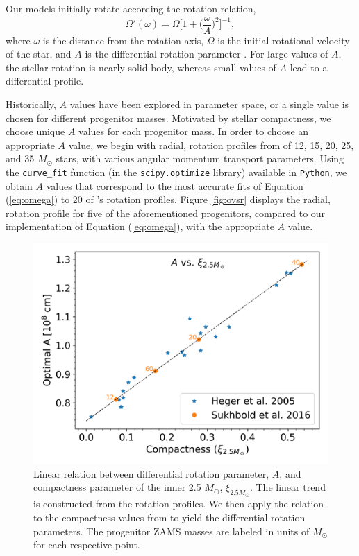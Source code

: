 \documentclass[twocolumn,times]{aastex62}  %
\begin{document}
Our models initially rotate according the rotation relation, 
\begin{equation}
    \Omega'(\omega) = \Omega \bigg[1 + \bigg(\frac{\omega}{A}\bigg)^2 \bigg]^{-1}, 
    \label{eq:omega}
\end{equation}
where $\omega$ is the distance from the rotation axis, $\Omega$ is the initial rotational velocity of the star, and $A$ is the differential rotation parameter \citep{eriguchi:1984}.  For large values of $A$, the stellar rotation is nearly solid body, whereas small values of $A$ lead to a differential profile.  \par Historically, $A$ values have been explored in parameter space, or a single value is chosen for different progenitor masses.  Motivated by stellar compactness, we choose unique $A$ values for each progenitor mass.  In order to choose an appropriate $A$ value, we begin with radial, rotation profiles from \citet{heger:2005} of 12, 15, 20, 25, and 35 $M_{\odot}$ stars, with various angular momentum transport parameters.  Using the \texttt{curve\_fit} function (in the \texttt{scipy.optimize} library) available in \texttt{Python}, we obtain $A$ values that correspond to the most accurate fits of Equation (\ref{eq:omega}) to 20 of \citeauthor{heger:2005}'s \citeyear{heger:2005} rotation profiles.  Figure \ref{fig:ovsr} displays the radial, rotation profile for five of the aforementioned progenitors, compared to our implementation of Equation (\ref{eq:omega}), with the appropriate $A$ value.


\begin{figure}[t]
    \centering
    \includegraphics[scale=0.45]{figures/a_vs_compact.png}
    \caption{Linear relation between differential rotation parameter, $A$, and compactness parameter of the inner 2.5 $M_\odot$, $\xi_{2.5M_\odot}$.  The linear trend is constructed from the \citet{heger:2005} rotation profiles.  We then apply the relation to the compactness values from \citet{Suk:2016} to yield the differential rotation parameters.  The progenitor ZAMS masses are labeled in units of $M_\odot$ for each respective point.}
    \label{fig:a_vs_comp}
\end{figure}
\end{document}
